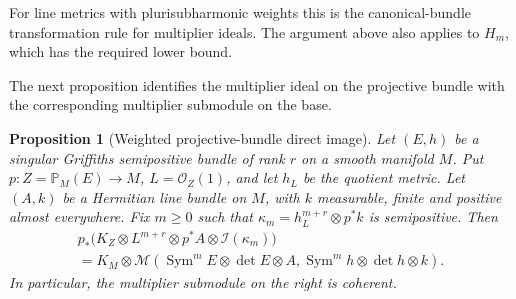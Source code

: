 \documentclass[11pt,reqno]{amsart}
\numberwithin{equation}{section}
\newtheorem{proposition}[theorem]{Proposition}
\theoremstyle{definition}
\theoremstyle{remark}
\newcommand{\OO}{\mathcal O}
\newcommand{\MM}{\mathcal M}
\newcommand{\II}{\mathcal I}
\newcommand{\PP}{\mathbb P}
\newcommand{\Sym}{\operatorname{Sym}}
\begin{document}
For line metrics with plurisubharmonic weights this is the canonical-bundle transformation rule for multiplier ideals. The argument above also applies to $H_m$, which has the required lower bound.

The next proposition identifies the multiplier ideal on the projective bundle with the corresponding multiplier submodule on the base.
\begin{proposition}[Weighted projective-bundle direct image]\label{prop:fiber}
Let $(E,h)$ be a singular Griffiths semipositive bundle of rank $r$ on a smooth manifold $M$. Put $p:Z=\PP_M(E)\to M$, $L=\OO_Z(1)$, and let $h_L$ be the quotient metric. Let $(A,k)$ be a Hermitian line bundle on $M$, with $k$ measurable, finite and positive almost everywhere. Fix $m\geq0$ such that $\kappa_m=h_L^{m+r}\otimes p^*k$ is semipositive. Then
\begin{multline}\label{eq:fiberidentity}
 p_*\bigl(K_Z\otimes L^{m+r}\otimes p^*A\otimes\II(\kappa_m)\bigr)\\
 =K_M\otimes\MM(\Sym^mE\otimes\det E\otimes A,
                         \Sym^mh\otimes\det h\otimes k).
\end{multline}
In particular, the multiplier submodule on the right is coherent.
\end{proposition}
\end{document}
